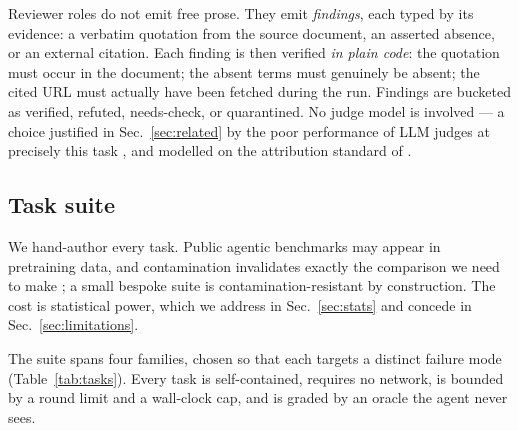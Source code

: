 \documentclass[11pt,a4paper]{article}
\begin{document}
Reviewer roles do not emit free prose. They emit \emph{findings}, each typed by
its evidence: a verbatim quotation from the source document, an asserted absence,
or an external citation. Each finding is then verified \emph{in plain code}: the
quotation must occur in the document; the absent terms must genuinely be absent;
the cited URL must actually have been fetched during the run. Findings are
bucketed as verified, refuted, needs-check, or quarantined. No judge model is
involved --- a choice justified in Sec.~\ref{sec:related} by the poor performance
of LLM judges at precisely this task \citep{advani2026falsesuccess}, and modelled
on the attribution standard of \citet{rashkin2023attribution}.

\subsection{Task suite}
\label{sec:tasks}

We hand-author every task. Public agentic benchmarks may appear in pretraining
data, and contamination invalidates exactly the comparison we need to make
\citep{sainz2023contamination}; a small bespoke suite is contamination-resistant
by construction. The cost is statistical power, which we address in
Sec.~\ref{sec:stats} and concede in Sec.~\ref{sec:limitations}.

The suite spans four families, chosen so that each targets a distinct failure
mode (Table~\ref{tab:tasks}). Every task is self-contained, requires no network,
is bounded by a round limit and a wall-clock cap, and is graded by an oracle the
agent never sees.
\end{document}
